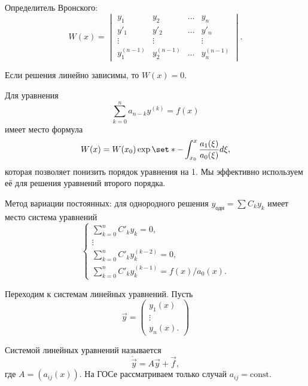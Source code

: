 Определитель Вронского:
\begin{equation*}
    W(x) = \begin{vmatrix}
        y_1 & y_2 & \ldots & y_n \\ y'_1 & y'_2 & \ldots & y'_n \\ \vdots & \vdots & & \vdots \\ y^{(n - 1)}_1 & y^{(n - 1)}_2 & \ldots & y^{(n - 1)}_n
    \end{vmatrix}.
\end{equation*}

Если решения линейно зависимы, то $W(x) = 0$.

Для уравнения
\begin{equation*}
    \sum_{k = 0}^n a_{n - k}y^{(k)} = f(x)
\end{equation*}
имеет место формула
\begin{equation*}
    W(x) = W(x_0)\exp\set*{-\int_{x_0}^x \frac{a_1(\xi)}{a_0(\xi)}d\xi},
\end{equation*}
которая позволяет понизить порядок уравнения на 1. Мы эффективно используем её для решения уравнений второго порядка.

Метод вариации постоянных: для однородного решения $y_{\text{одн}} = \sum C_ky_k$ имеет место система уравнений
\begin{equation*}
    \begin{cases}
        \sum_{k = 0}^n C'_k y_k = 0, \\
        \vdots \\
        \sum_{k = 0}^n C'_k y_k^{(k - 2)} = 0, \\
        \sum_{k = 0}^n C'_k y_k^{(k - 1)} = f(x) / a_0(x).
    \end{cases}
\end{equation*}

Переходим к системам линейных уравнений. Пусть
\begin{equation*}
    \vec{y} = \begin{pmatrix}
        y_1(x) \\ \vdots \\ y_n(x).
    \end{pmatrix}
\end{equation*}

Системой линейных уравнений называется
\begin{equation*}
    \dot{\vec{y}} = A\vec{y} + \vec{f},
\end{equation*}
где $A = (a_{ij}(x))$. На ГОСе рассматриваем только случай $a_{ij} = \mathrm{const}$. 

